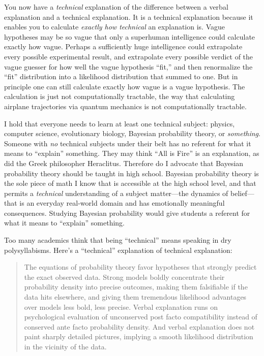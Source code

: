 {
 You now have a \textit{technical} explanation of the difference
between a verbal explanation and a technical explanation. It is a
technical explanation because it enables you to calculate
\textit{exactly how technical} an explanation is. Vague hypotheses may
be so vague that only a superhuman intelligence could calculate exactly
how vague. Perhaps a sufficiently huge intelligence could extrapolate
every possible experimental result, and extrapolate every possible
verdict of the vague guesser for how well the vague hypothesis
``fit,'' and then renormalize the
``fit'' distribution into a
likelihood distribution that summed to one. But in principle one can
still calculate exactly how vague is a vague hypothesis. The
calculation is just not computationally tractable, the way that
calculating airplane trajectories via quantum mechanics is not
computationally tractable.}

{
 I hold that everyone needs to learn at least one technical
subject: physics, computer science, evolutionary biology, Bayesian
probability theory, or \textit{something}. Someone with \textit{no}
technical subjects under their belt has no referent for what it means
to ``explain'' something. They may
think ``All is Fire'' is an
explanation, as did the Greek philosopher Heraclitus. Therefore do I
advocate that Bayesian probability theory should be taught in high
school. Bayesian probability theory is the sole piece of math I know
that is accessible at the high school level, and that permits a
\textit{technical} understanding of a subject matter---the dynamics of
belief---that is an everyday real-world domain and has emotionally
meaningful consequences. Studying Bayesian probability would give
students a referent for what it means to
``explain'' something.}

{
 Too many academics think that being
``technical'' means speaking in dry
polysyllabisms. Here's a
``technical'' explanation of
technical explanation:}

\begin{quote}
{
 The equations of probability theory favor hypotheses that strongly
predict the exact observed data. Strong models boldly concentrate their
probability density into precise outcomes, making them falsifiable if
the data hits elsewhere, and giving them tremendous likelihood
advantages over models less bold, less precise. Verbal explanation runs
on psychological evaluation of unconserved post facto compatibility
instead of conserved ante facto probability density. And verbal
explanation does not paint sharply detailed pictures, implying a smooth
likelihood distribution in the vicinity of the data.}
\end{quote}

